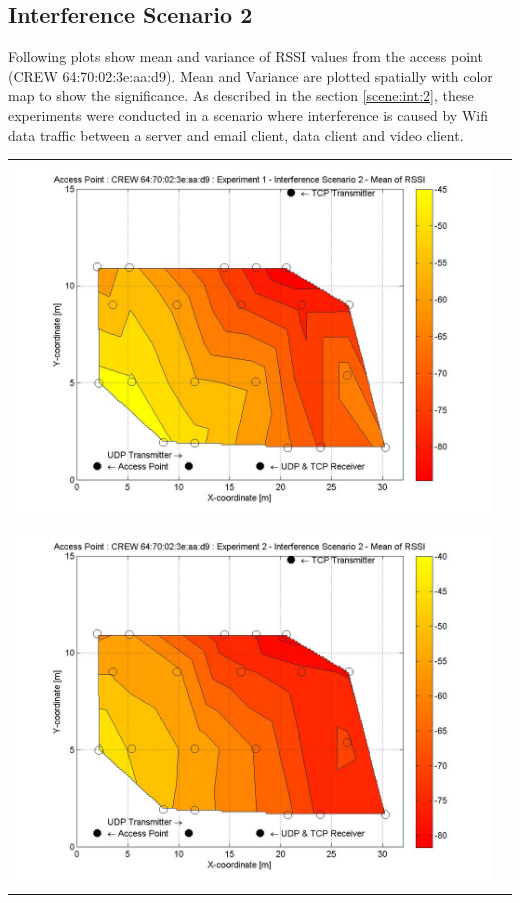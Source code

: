\documentclass[11pt,a4paper,headinclude,footinclude,chapterprefix=on]{scrreprt}
\begin{document}
\subsection{Interference Scenario 2} 
Following plots show mean and variance of RSSI values from the access point (CREW 64:70:02:3e:aa:d9). Mean and Variance are plotted spatially with color map to show the significance. As described in the section \ref{scene:int:2}, these experiments were conducted in a scenario where interference is caused by Wifi data traffic between a server and email client, data client and video client.
\begin{longtable}
	{lr} 
	\includegraphics[width=13cm]{../../Source/plot/CREW_d9/d9_Wifi_Ex_1_Mean.jpg} \\
	\includegraphics[width=13cm]{../../Source/plot/CREW_d9/d9_Wifi_Ex_2_Mean.jpg} \\

\end{longtable}
\end{document}
